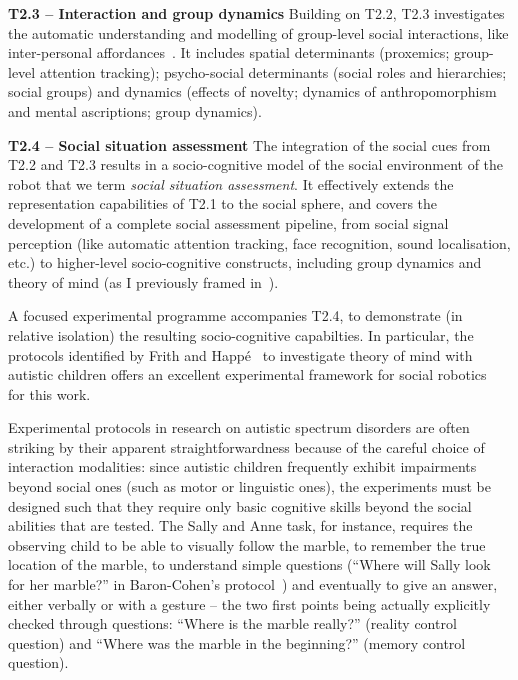 \documentclass[11pt,a4paper]{report}
\begin{document}
\textbf{T2.3 -- Interaction and group dynamics} Building on T2.2, T2.3
investigates the automatic understanding and modelling of group-level social
interactions, like inter-personal affordances~\cite{pandey2013affordance}. It
includes spatial determinants (proxemics; group-level attention tracking);
psycho-social determinants (social roles and hierarchies; social groups) and
dynamics (effects of novelty; dynamics of anthropomorphism and mental
ascriptions; group dynamics). 


\textbf{T2.4 -- Social situation assessment} The integration of the social cues
from T2.2 and T2.3 results in a socio-cognitive model of the social environment
of the robot that we term \emph{social situation assessment}.  It effectively
extends the representation capabilities of T2.1 to the social sphere, and covers
the development of a complete social assessment pipeline, from social signal
perception (like automatic attention tracking, face recognition, sound
localisation, etc.) to higher-level socio-cognitive constructs, including group
dynamics and theory of mind (as I previously framed
in~\cite{lemaignan2015mutual, dillenbourg2016symmetry}).


A focused experimental
programme accompanies T2.4, to demonstrate (in relative isolation) the resulting
socio-cognitive capabilties. In particular, the protocols identified by Frith
and Happé~\cite{frith1994autism} to investigate theory of mind with autistic
children offers an excellent experimental framework for social
robotics~\cite{lemaignan2015mutual} for this work.

Experimental protocols in research on autistic spectrum disorders are often
striking by their apparent straightforwardness because of the careful choice of
interaction modalities: since autistic children frequently exhibit impairments
beyond social ones (such as motor or linguistic ones), the experiments must be
designed such that they require only basic cognitive skills beyond the social
abilities that are tested. The Sally and Anne task, for instance, requires the
observing child to be able to visually follow the marble, to remember the true
location of the marble, to understand simple questions (``Where will Sally look
for her marble?'' in Baron-Cohen's protocol~\cite{baron1985does}) and eventually
to give an answer, either verbally or with a gesture -- the two first points
being actually explicitly checked through questions: ``Where is the marble
really?'' (reality control question) and ``Where was the marble in the
beginning?'' (memory control question).
\end{document}
